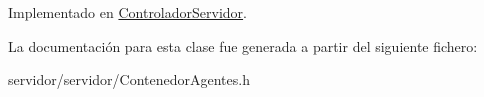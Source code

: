 \-Implementado en \hyperlink{classControladorServidor_ad323cf3309ee0ddc8737c16a48432c28}{\-Controlador\-Servidor}.



\-La documentación para esta clase fue generada a partir del siguiente fichero\-:\begin{DoxyCompactItemize}
\item 
servidor/servidor/\-Contenedor\-Agentes.\-h\end{DoxyCompactItemize}
